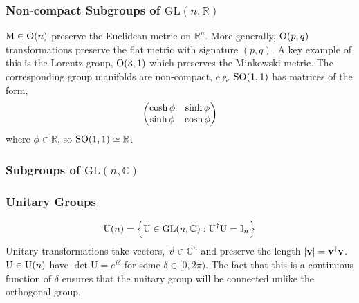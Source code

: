 \subsubsection*{Non-compact Subgroups of $\text{GL}(n, \mathbb{R})$}
$\text{M} \in \Orth{n}$ preserve the Euclidean metric on $\mathbb{R}^n$. More generally, $\Orth{p,q}$ transformations preserve the flat metric with signature $(p, q)$. A key example of this is the Lorentz group, $\Orth{3,1}$ which preserves the Minkowski metric. The corresponding group manifolds are non-compact, e.g. $\SO{1,1}$ has matrices of the form,
\begin{equation*}
\begin{pmatrix}\cosh \phi&\sinh \phi \\ \sinh \phi&\cosh \phi \end{pmatrix}
\end{equation*}
where $\phi \in \mathbb{R}$, so $\SO{1,1} \simeq \mathbb{R}$.
\subsubsection{Subgroups of $\text{GL}(n, \mathbb{C})$}
\subsubsection*{Unitary Groups}
\begin{equation}
\Uni{n} = \set{\text{U} \in \text{GL}(n, \mathbb{C}) : \text{U}^{\dagger}\text{U} = \mathbb{I}_n}
\end{equation}
Unitary transformations take vectors, $\vec v \in \mathbb{C}^n$ and preserve the length $\abs{\vec v} = \vec{v}^{\dagger} \vec v$. $\text{U} \in \Uni{n}$ have $\det \text{U} = e^{i\delta}$ for some $\delta \in [0,2\pi)$. The fact that this is a continuous function of $\delta$ ensures that the unitary group will be connected unlike the orthogonal group.
